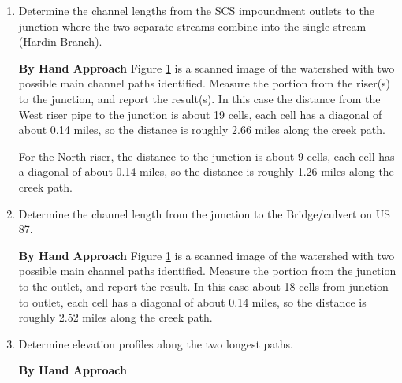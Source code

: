 \documentclass[12pt]{article}
\begin{document}
\begin{enumerate}
\begin{figure}[h!] %
   \centering
   \texttt{[image: Scan2.png]} 
   \caption{Study Area -- with grid overlay, outlet (Blue Dot), and subcatchments identified.  Various flow paths are indicted in transparent blue.  1,693 Squares counted to estimate watershed area.  Two long channel paths identified.  Main channel is the longer path (assuming flow passes through the dam).}
   \label{fig:ES2-WatershedArea-3}
\end{figure}

\clearpage

\item Determine the channel lengths from the SCS impoundment outlets to the junction where the two separate streams combine into the single stream (Hardin Branch).

\textbf{By Hand Approach}
Figure \ref{fig:ES2-WatershedArea-3} is a scanned image of the watershed with two possible main channel paths identified.  Measure the portion from the riser(s) to the junction, and report the result(s).  In this case the distance from the West riser pipe to the junction is about 19 cells, each cell has a diagonal of about 0.14 miles, so the distance is roughly 2.66 miles along the creek path.

For the North riser, the distance to the junction is about 9 cells, each cell has a diagonal of about 0.14 miles, so the distance is roughly 1.26 miles along the creek path.

\clearpage

\item Determine the channel length from the junction to the Bridge/culvert on US 87.

\textbf{By Hand Approach}
Figure \ref{fig:ES2-WatershedArea-3} is a scanned image of the watershed with two possible main channel paths identified.  Measure the portion from the junction to the outlet, and report the result.  In this case about 18 cells from junction to outlet, each cell has a diagonal of about 0.14 miles, so the distance is roughly 2.52 miles along the creek path.

\clearpage

\item Determine elevation profiles along the two longest paths.

\textbf{By Hand Approach}


\end{enumerate}
\end{document}
